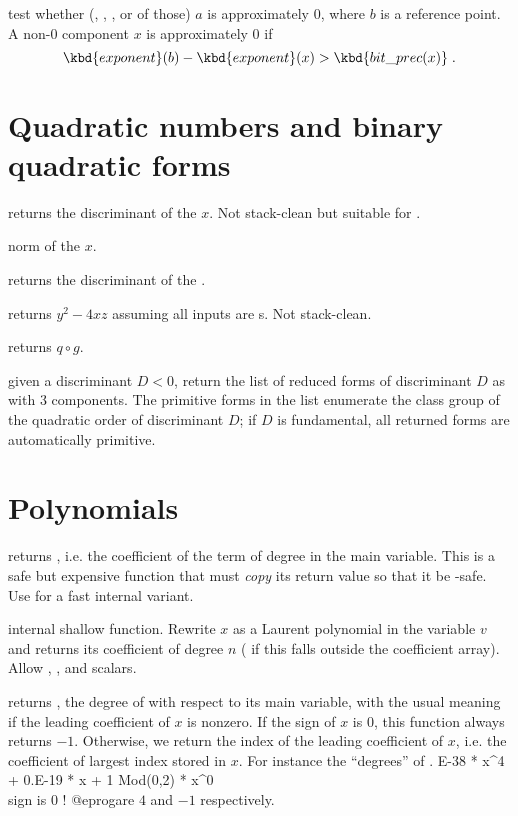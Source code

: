  test whether (, ,
, or  of those) $a$ is approximately $0$, where $b$
is a reference point. A non-$0$  component $x$ is
approximately $0$ if
$$\kbd{exponent}(b) - \kbd{exponent}(x) > \kbd{bit\_prec(x)}\;.$$

\section{Quadratic numbers and binary quadratic forms}

 returns the discriminant of the  $x$.
Not stack-clean but suitable for .

 norm of the  $x$.

 returns the discriminant of the 
.

 returns $y^2 - 4xz$ assuming all
inputs are s. Not stack-clean.

 returns $q \circ g$.

 given a discriminant $D < 0$, return the list
of reduced forms of discriminant $D$ as  with 3 components.
The primitive forms in the list enumerate the class group of the quadratic
order of discriminant $D$; if $D$ is fundamental, all returned forms
are automatically primitive.

\section{Polynomials}\label{se:polynomials}

 returns , i.e.
the coefficient of the term of degree  in the main variable. This is
a safe but expensive function that must \emph{copy} its return value so that
it be -safe. Use  for a fast internal variant.

 internal shallow function. Rewrite
$x$ as a Laurent polynomial in the variable $v$ and returns its coefficient
of degree $n$ ( if this falls outside the coefficient array).
Allow , ,  and scalars.

 returns , the degree of
 with respect to its main variable, with the usual meaning if the
leading coefficient of $x$ is nonzero. If the sign of $x$ is $0$, this
function always returns $-1$. Otherwise, we return the index of the leading
coefficient of $x$, i.e. the coefficient of largest index stored in $x$.
For instance the ``degrees'' of
. E-38 * x^4 + 0.E-19 * x + 1
  Mod(0,2) * x^0    \\ sign is 0 !
@eprog\noindent are $4$ and $-1$ respectively.

